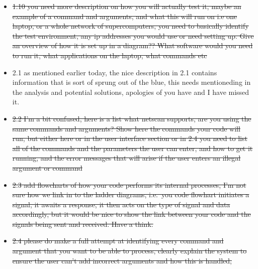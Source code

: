 \documentclass{article}
\begin{document}
\begin{itemize}
  \item{\sout{1.10 you need more description on how you will actually test it, maybe an example of a command and arguments, and what this will run on i.e one laptop, or a whole network of supercomputers, you need to basically identify the test environment, any ip addresses you would use or need setting up. Give an overview of how it is set up in a diagram??  What software would you need to run it, what applications on the laptop, what commands etc}}

  \item{2.1 as mentioned earlier today, the nice description in 2.1 contains information that is sort of sprung out of the blue, this needs mentioneding in the analysis and potential solutions, apologies of you have and I have missed it.}

  \item{\sout{2.2 I'm a bit confused, here is a list what netscan supports, are you using the same commands and arguments? Show here the commands your code will run,  but either here or in the user interface section or in 2.4 you need to list all of the commands and the parameters the user can enter, and how to get it running, and the error messages that will arise if the user enters an illegal argument or command}}

  \item{\sout{2.3 add flowcharts of how your code performs its internal processes, I'm not sure how we link in to the ladder diagrams, i.e.\ you code flowhart initiates a signal, it awaits a response, it then acts on the type of signal and data accordingly, but it would be nice to show the link between your code and the signals being sent and received. Have a think.}}

  \item{\sout{2.4 please do make a full attempt at identifying every command and argument that you want to be able to process, clearly explain the system to ensure the user can't add incorrect arguments and how this is handled,}}

\end{itemize}
\end{document}
